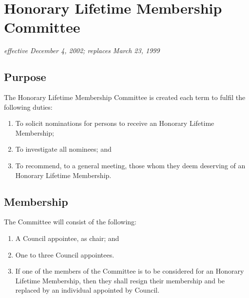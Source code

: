 \section{Honorary Lifetime Membership Committee}
\emph{effective December 4, 2002; replaces March 23, 1999}

\subsection{Purpose}
The Honorary Lifetime Membership Committee is created each term to fulfil the following duties:
\begin{enumerate}
\item To solicit nominations for persons to receive an Honorary Lifetime Membership;
\item To investigate all nominees; and
\item To recommend, to a general meeting, those whom they deem deserving of an Honorary Lifetime Membership.
\end{enumerate}

\subsection{Membership}
The Committee will consist of the following:
\begin{enumerate}
\item A Council appointee, as chair; and
\item One to three Council appointees.
\item If one of the members of the Committee is to be considered for an Honorary Lifetime Membership, then they shall resign their membership and be replaced by an individual appointed by Council.
\end{enumerate}

